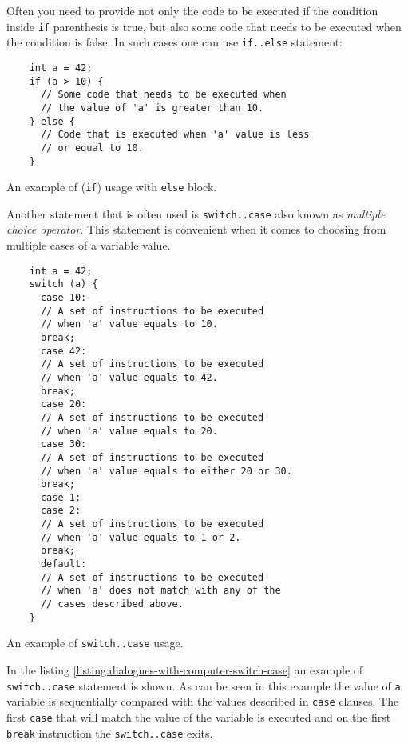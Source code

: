 \documentclass[../sparc.tex]{subfiles}
\begin{document}
Often you need to provide not only the code to be executed if the condition
inside \texttt{if} parenthesis is true, but also some code that needs to be
executed when the condition is false.  In such cases one can use
\texttt{if..else} statement:

\begin{listing}[ht]
  \begin{verbatim}
    int a = 42;
    if (a > 10) {
      // Some code that needs to be executed when
      // the value of 'a' is greater than 10.
    } else {
      // Code that is executed when 'a' value is less
      // or equal to 10.
    }
  \end{verbatim}
  \label{listing:dialogues-with-computer-if-with-else}
  \caption{An example of (\texttt{if}) usage with \texttt{else} block.}
\end{listing}

Another statement that is often used is \texttt{switch..case} also known as
\emph{multiple choice operator}.  This statement is convenient when it comes to
choosing from multiple cases of a variable value.

\begin{listing}[ht]
  \begin{verbatim}
    int a = 42;
    switch (a) {
      case 10:
      // A set of instructions to be executed
      // when 'a' value equals to 10.
      break;
      case 42:
      // A set of instructions to be executed
      // when 'a' value equals to 42.
      break;
      case 20:
      // A set of instructions to be executed
      // when 'a' value equals to 20.
      case 30:
      // A set of instructions to be executed
      // when 'a' value equals to either 20 or 30.
      break;
      case 1:
      case 2:
      // A set of instructions to be executed
      // when 'a' value equals to 1 or 2.
      break;
      default:
      // A set of instructions to be executed
      // when 'a' does not match with any of the
      // cases described above.
    }
  \end{verbatim}
  \label{listing:dialogues-with-computer-switch-case}
  \caption{An example of \texttt{switch..case} usage.}
\end{listing}

In the listing \ref{listing:dialogues-with-computer-switch-case} an example of
\texttt{switch..case} statement is shown. As can be seen in this example the
value of \texttt{a} variable is sequentially compared with the values described
in \texttt{case} clauses.  The first \texttt{case} that will match the value of
the variable is executed and on the first \texttt{break} instruction the
\texttt{switch..case} exits.
\end{document}
